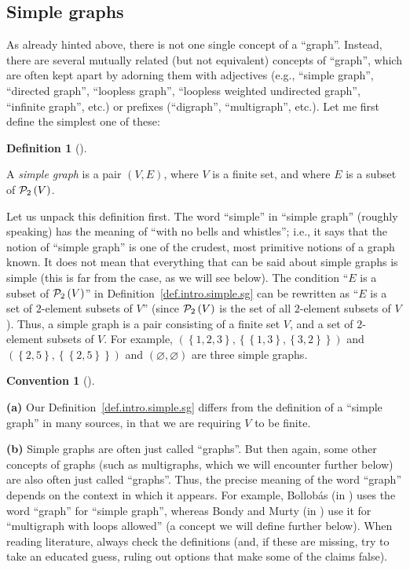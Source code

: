 \documentclass[numbers=enddot,12pt,final,onecolumn,notitlepage]{scrartcl}%
\theoremstyle{definition}
\newtheorem{defi}[theo]{Definition}
\newenvironment{definition}[1][]
{\begin{defi}[#1]\begin{leftbar}}
{\end{leftbar}\end{defi}}
\newtheorem{conv}[theo]{Convention}
\newenvironment{convention}[1][]
{\begin{conv}[#1]\begin{leftbar}}
{\end{leftbar}\end{conv}}
\newenvironment{convention}[1][Convention]{\noindent\textbf{#1.} }{\ \rule{0.5em}{0.5em}}
\newcommand{\powset}[2][]{\ifthenelse{\equal{#2}{}}{\mathcal{P}\left(#1\right)}{\mathcal{P}_{#1}\left(#2\right)}}
\newcommand{\set}[1]{\left\{ #1 \right\}}
\newcommand{\tup}[1]{\left( #1 \right)}
\begin{document}
\subsection{\label{sect.intro.simple}Simple graphs}

As already hinted above, there is not one single concept of a
``graph''. Instead, there are several mutually related (but not
equivalent) concepts of ``graph'', which are often kept apart by
adorning them with adjectives (e.g., ``simple graph'', ``directed
graph'', ``loopless graph'', ``loopless weighted undirected
graph'', ``infinite graph'', etc.) or prefixes (``digraph'',
``multigraph'', etc.). Let me first define the simplest one of these:

\begin{definition} \label{def.intro.simple.sg}
A \textit{simple graph} is a pair $\tup{V, E}$, where $V$ is a
finite set, and where $E$ is a subset of $\powset[2]{V}$.
\end{definition}

Let us unpack this definition first. The word ``simple'' in
``simple graph'' (roughly speaking) has the meaning of ``with no
bells and whistles''; i.e., it says that the notion of
``simple graph'' is one of the crudest, most primitive notions of
a graph known.
It does not mean
that everything that can be said about simple graphs is simple (this
is far from the case, as we will see below). The condition
``$E$ is a subset of $\powset[2]{V}$'' in
Definition~\ref{def.intro.simple.sg} can be rewritten as ``$E$ is a
set of $2$-element subsets of $V$'' (since $\powset[2]{V}$ is the set
of all $2$-element subsets of $V$). Thus, a simple graph is a pair
consisting of a finite set $V$, and a set of $2$-element subsets of
$V$.
For example,
$\left(\set{1,2,3}, \set{\set{1,3}, \set{3,2}} \right)$ and
$\left(\set{2,5}, \set{\set{2,5}}\right)$ and
$\left(\varnothing, \varnothing\right)$ are three simple graphs.

\begin{convention}
\textbf{(a)}
Our Definition~\ref{def.intro.simple.sg} differs from the definition
of a ``simple graph'' in many sources, in that we are requiring $V$ to
be finite.

\textbf{(b)}
Simple graphs are often just called ``graphs''. But then again, some
other concepts of graphs (such as multigraphs, which we will
encounter further below) are also often just called ``graphs''. Thus,
the precise meaning of the word ``graph'' depends on the context in
which it appears. For example, Bollob\'as (in \cite{Bollob79}) uses
the word ``graph'' for ``simple graph'', whereas Bondy and Murty
(in \cite{BonMur08}) use it for ``multigraph with loops allowed''
(a concept we will define further below).
When reading literature, always check the
definitions (and, if these are missing, try to take an educated guess,
ruling out options that make some of the claims false).
\end{convention}
\end{document}

